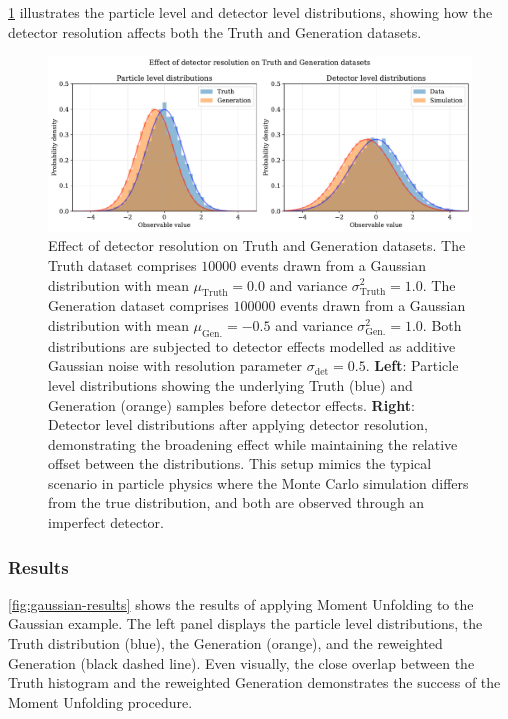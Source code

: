             \cref{fig:gaussian-setup} illustrates the particle level and detector level distributions, showing how the detector resolution affects both the Truth and Generation datasets.
\begin{figure}
    \centering
    \includegraphics[width=\textwidth]{figures/chapter-05/gaussian-setup.pdf}
    \caption[Effect of detector resolution on Truth and Generation datasets]{%
        Effect of detector resolution on Truth and Generation datasets. 
        The Truth dataset comprises $\num{10000}$ events drawn from a Gaussian distribution 
        with mean $\mu_{\textrm{Truth}} = 0.0$ and variance $\sigma^2_{\textrm{Truth}} = 1.0$. 
        The Generation dataset comprises $\num{100000}$ events drawn from a Gaussian distribution 
        with mean $\mu_{\textrm{Gen.}} = -0.5$ and variance $\sigma^2_{\textrm{Gen.}} = 1.0$. 
        Both distributions are subjected to detector effects modelled as additive Gaussian noise 
        with resolution parameter $\sigma_{\textrm{det}} = 0.5$. 
        \textbf{Left}: Particle level distributions showing the underlying Truth (blue) and 
        Generation (orange) samples before detector effects. 
        \textbf{Right}: Detector level distributions after applying detector resolution, 
        demonstrating the broadening effect while maintaining the relative offset between 
        the distributions. This setup mimics the typical scenario in particle physics where 
        the Monte Carlo simulation differs from the true distribution, and both are observed 
        through an imperfect detector.%
    }
    \label{fig:gaussian-setup}
\end{figure}
        \subsubsection{Results}
            \cref{fig:gaussian-results} shows the results of applying Moment Unfolding to the Gaussian example.
            The left panel displays the particle level distributions, the Truth distribution (blue), the Generation (orange), and the reweighted Generation (black dashed line). 
            Even visually, the close overlap between the Truth histogram and the reweighted Generation demonstrates the success of the Moment Unfolding procedure.

